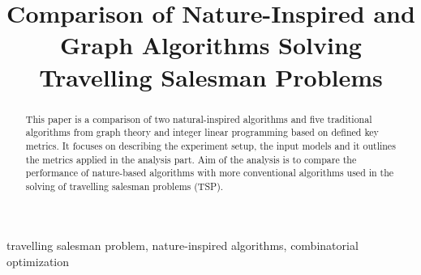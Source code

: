 \documentclass[conference]{IEEEtran}
\begin{document}
	
	\title{Comparison of Nature-Inspired and Graph Algorithms Solving Travelling Salesman Problems}
	
	\author{
		\and
	}
	
	\maketitle
	
	\begin{abstract}
		This paper is a comparison of two natural-inspired algorithms and five traditional algorithms from graph theory and integer linear programming based on defined key metrics. It focuses on describing the experiment setup, the input models and it outlines the metrics applied in the analysis part. Aim of the analysis is to compare the performance of nature-based algorithms with more conventional algorithms used in the solving of travelling salesman problems (TSP).\\
	\end{abstract}
	
	\begin{IEEEkeywords}
		travelling salesman problem, nature-inspired algorithms, combinatorial optimization
	\end{IEEEkeywords}
\end{document}
